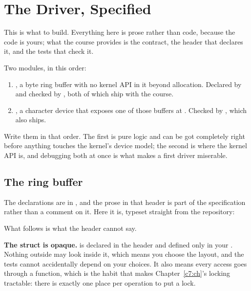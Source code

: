 
\section{The Driver, Specified}
\label{c5:app:b}

This is what to build. Everything here is prose rather than code, because the code is yours; what
the course provides is the contract, the header that declares it, and the tests that check it.

Two modules, in this order:
\begin{enumerate}
  \item \textbf{}, a byte ring buffer with no kernel API in it beyond allocation.
    Declared by  and checked by
    , both of which ship with the course.
  \item \textbf{}, a character device that exposes one of those buffers at
    . Checked by , which also ships.
\end{enumerate}
Write them in that order. The first is pure logic and can be got completely right before anything
touches the kernel's device model; the second is where the kernel API is, and debugging both at once
is what makes a first driver miserable.

\subsection{The ring buffer}
\label{c5:app:b1}

The declarations are in , and the prose in that header is part of
the specification rather than a comment on it. Here it is, typeset straight from the repository:


\noindent What follows is what the header cannot say.

\textbf{The struct is opaque.}  is declared in the header and defined only in
your . Nothing outside may look inside it, which means you choose the layout, and the tests
cannot accidentally depend on your choices. It also means every access goes through a function,
which is the habit that makes Chapter~\ref{c7:ch}'s locking tractable: there is exactly one place
per operation to put a lock.

